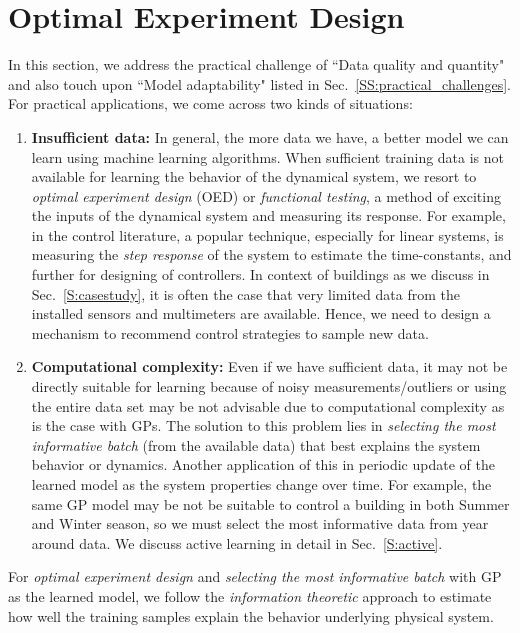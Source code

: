 \section{Optimal Experiment Design}
\label{S:oed}

In this section, we address the practical challenge of ``Data quality and quantity" and also touch upon ``Model adaptability" listed in Sec.~\ref{SS:practical_challenges}.
\\

For practical applications, we come across two kinds of situations:
\begin{enumerate}
	\item \textbf{Insufficient data:} In general, the more data we have, a better model we can learn using machine learning algorithms. When sufficient training data is not available for learning the behavior of the dynamical system, we resort to \textit{optimal experiment design} (OED) or \textit{functional testing}, a method of exciting the inputs of the dynamical system and measuring its response. For example, in the control literature, a popular technique, especially for linear systems, is measuring the \textit{step response} of the system to estimate the time-constants, and further for designing of controllers. In context of buildings as we discuss in Sec.~\ref{S:casestudy}, it is often the case that very limited data from the installed sensors and multimeters are available. Hence, we need to design a mechanism to recommend control strategies to sample new data.
	
	\item \textbf{Computational complexity:} Even if we have sufficient data, it may not be directly suitable for learning because of noisy measurements/outliers or using the entire data set may be not advisable due to computational complexity as is the case with GPs. The solution to this problem lies in \textit{selecting the most informative batch} (from the available data) that best explains the system behavior or dynamics. Another application of this in periodic update of the learned model as the system properties change over time. For example, the same GP model may be not be suitable to control a building in both Summer and Winter season, so we must select the most informative data from year around data. We discuss active learning in detail in Sec.~\ref{S:active}.
\end{enumerate}

For \textit{optimal experiment design} and \textit{selecting the most informative batch} with GP as the learned model, we follow the \textit{information theoretic} approach to estimate how well the training samples explain the behavior underlying physical system.

